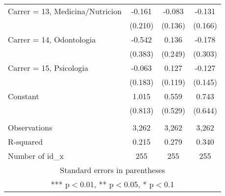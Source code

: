 \documentclass[]{article}
\begin{document}
\begin{tabular}{lccc}
Carrer = 13, Medicina/Nutricion & -0.161 & -0.083 & -0.131 \\
 & (0.210) & (0.136) & (0.166) \\
Carrer = 14, Odontologia & -0.542 & 0.136 & -0.178 \\
 & (0.383) & (0.249) & (0.303) \\
Carrer = 15, Psicologia & -0.063 & 0.127 & -0.127 \\
 & (0.183) & (0.119) & (0.145) \\
Constant & 1.015 & 0.559 & 0.743 \\
 & (0.813) & (0.529) & (0.644) \\
 &  &  &  \\
Observations & 3,262 & 3,262 & 3,262 \\
R-squared & 0.215 & 0.279 & 0.340 \\
 Number of id\_x & 255 & 255 & 255 \\ \hline
\multicolumn{4}{c}{ Standard errors in parentheses} \\
\multicolumn{4}{c}{ *** p$<$0.01, ** p$<$0.05, * p$<$0.1} \\
\end{tabular}
\end{document}
